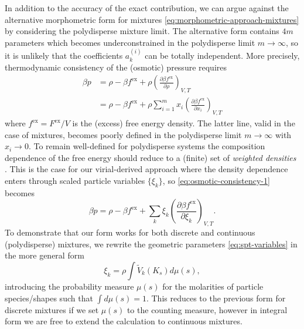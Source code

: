 \documentclass[11pt,twoside]{report}
\begin{document}
In addition to the accuracy of the exact contribution, we can argue against the alternative morphometric form for mixtures \eqref{eq:morphometric-approach-mixtures} by considering the polydisperse mixture limit.
The alternative form contains $4m$ parameters which becomes underconstrained in the polydisperse limit $m \to \infty$, so it is unlikely that the coefficients $a_k^{(i)}$ can be totally independent.
More precisely, thermodynamic consistency of the (osmotic) pressure requires
\begin{equation}\label{eq:osmotic-consistency-1}
  \begin{split}
    \beta p
    &=
    \rho - \beta f^\mathrm{ex}
    + \rho \left( \frac{\partial \beta f^\mathrm{ex}}{\partial \rho} \right)_{V,T}
    \\
    &=
    \rho - \beta f^\mathrm{ex}
    + \rho \sum_{i=1}^m
    x_i \left( \frac{\partial \beta f^\mathrm{ex}}{\partial x_i} \right)_{V,T}
  \end{split}
\end{equation}
where $f^\mathrm{ex} = F^\mathrm{ex}/V$ is the (excess) free energy density.
The latter line, valid in the case of mixtures, becomes poorly defined in the polydisperse limit $m \to \infty$ with $x_i \to 0$.
To remain well-defined for polydisperse systems the composition dependence of the free energy should reduce to a (finite) set of \emph{weighted densities} \cite{GualtieriJCP1982, WarrenPRL1998, SollichPRL1998, SollichAiCP2001}.
This is the case for our virial-derived approach where the density dependence enters through scaled particle variables $\{\xi_k\}$, so \eqref{eq:osmotic-consistency-1} becomes
\begin{equation}\label{eq:osmotic-consistency-2}
  \beta p
  =
  \rho - \beta f^\mathrm{ex}
  + \sum_k
  \xi_k \left( \frac{\partial \beta f^\mathrm{ex}}{\partial \xi_k} \right)_{V,T}.
\end{equation}
To demonstrate that our form works for both discrete and continuous (polydisperse) mixtures, we rewrite the geometric parameters \eqref{eq:spt-variables} in the more general form
\begin{equation}
  \xi_k
  =
  \rho \int \widetilde{V}_k(K_s) d\mu(s),
\end{equation}
introducing the probability measure $\mu(s)$ for the molarities of particle species/shapes such that $\int d\mu(s) = 1$.
This reduces to the previous form for discrete mixtures if we set $\mu(s)$ to the counting measure, however in integral form we are free to extend the calculation to continuous mixtures.
\end{document}
